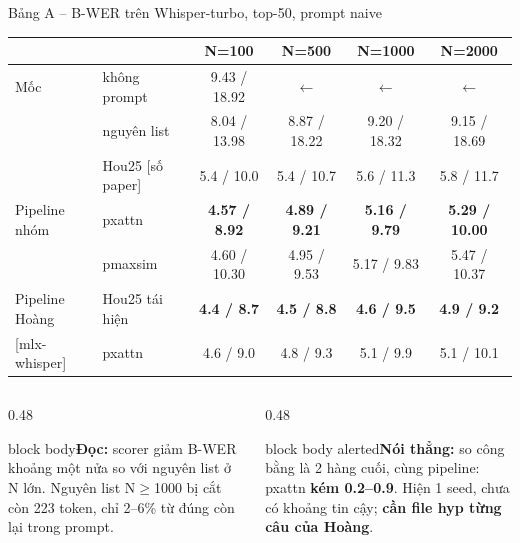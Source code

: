 \documentclass[aspectratio=169,xcolor=table]{beamer}
\newcommand{\bad}[1]{\textcolor{RiskRed}{\textbf{#1}}}
\newcommand{\good}[1]{\textcolor{GoodGreen}{\textbf{#1}}}
\newcommand{\src}[1]{{\tiny\color{TextGray}[#1]}}
\newcommand{\nbox}[2][block body]{\begin{beamercolorbox}[sep=0.45em,rounded=true]{#1}\footnotesize #2\end{beamercolorbox}}
\begin{document}
\begin{frame}{Bảng A -- B-WER trên Whisper-turbo, top-50, prompt naive}
\centering\footnotesize\setlength{\tabcolsep}{4pt}
\begin{tabular}{llcccc}
\toprule
 & & N=100 & N=500 & N=1000 & N=2000\\
\midrule
Mốc & không prompt & 9.43 / 18.92 & $\leftarrow$ & $\leftarrow$ & $\leftarrow$\\
 & nguyên list & 8.04 / 13.98 & 8.87 / 18.22 & 9.20 / 18.32 & 9.15 / 18.69\\
 & Hou25 \src{số paper} & 5.4 / 10.0 & 5.4 / 10.7 & 5.6 / 11.3 & 5.8 / 11.7\\
\midrule
Pipeline nhóm & pxattn & \textbf{4.57 / 8.92} & \textbf{4.89 / 9.21} & \textbf{5.16 / 9.79} & \textbf{5.29 / 10.00}\\
 & pmaxsim & 4.60 / 10.30 & 4.95 / 9.53 & 5.17 / 9.83 & 5.47 / 10.37\\
\midrule
Pipeline Hoàng & Hou25 tái hiện & \good{4.4 / 8.7} & \good{4.5 / 8.8} & \good{4.6 / 9.5} & \good{4.9 / 9.2}\\
\src{mlx-whisper} & pxattn & 4.6 / 9.0 & 4.8 / 9.3 & 5.1 / 9.9 & 5.1 / 10.1\\
\bottomrule
\end{tabular}\par
\vspace{0.2cm}\raggedright
\begin{columns}[T]
\begin{column}{0.48\textwidth}
\nbox{\textbf{Đọc:} scorer giảm B-WER khoảng một nửa so với nguyên list ở N lớn. Nguyên list N$\geq$1000 bị cắt còn 223 token, chỉ 2--6\% từ đúng còn lại trong prompt.}
\end{column}
\begin{column}{0.48\textwidth}
\nbox[block body alerted]{\textbf{Nói thẳng:} so công bằng là 2 hàng cuối, cùng pipeline: pxattn \bad{kém 0.2--0.9}. Hiện 1 seed, chưa có khoảng tin cậy; \textbf{cần file hyp từng câu của Hoàng}.}
\end{column}
\end{columns}
\end{frame}
\end{document}

